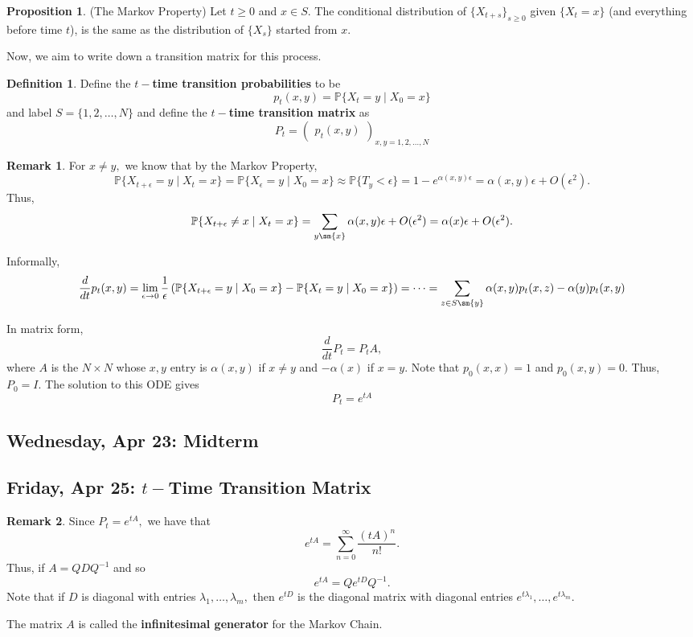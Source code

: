 \documentclass[10pt, oneside]{article}
\newcommand{\bbP}{\mathbb{P}}
\theoremstyle{definition}
\newtheorem{defn}{Definition}
\newtheorem{prop}{Proposition}
\newtheorem{rem}{Remark}
\begin{document}
\begin{prop}
(The Markov Property)
    Let $t \geq 0$ and $x\in S.$ The conditional distribution of $\{X_{t + s}\}_{s\geq 0 }$ given $\{X_t = x\}$ (and everything before time $t$), is the same as the distribution of $\{X_s\}$ started from $x.$ 
\end{prop}

Now, we aim to write down a transition matrix for this process. 
\begin{defn}
    Define the \textbf{$t-$time transition probabilities} to be 
    \[p_t(x,y) = \bbP\{X_t = y  \mid X_0 = x\}\] and label $S = \{1,2,\dots, N\}$ and define the \textbf{$t-$time transition matrix} as 
    \[P_t = \begin{pmatrix}
        p_t(x,y)
    \end{pmatrix}_{x,y = 1,2,\dots, N}\]
\end{defn}
\begin{rem}
For $x\neq y,$ we know that by the Markov Property, 
\[\bbP\{X_{t  + \epsilon} = y \mid X_t = x\} = \bbP\{X_\epsilon = y \mid X_0 = x\} \approx \bbP\{T_y < \epsilon\} = 1 - e^{\alpha(x,y)\epsilon}  = \alpha(x,y)\epsilon + O(\epsilon^2).\] Thus, 
\[\bbP\{X_{t + \epsilon} \neq x \mid X_t = x\} = \sum_{y \sm \{x\}}\alpha(x,y)\epsilon  + O(\epsilon^2) = \alpha(x)\epsilon + O(\epsilon^2).\]

Informally, \[\frac{d}{dt}p_t(x,y) = \lim_{\epsilon \to 0} \frac{1}{\epsilon}\left(\bbP\{X_{t + \epsilon }  = y \mid X_0 = x\} - \bbP\{X_t = y \mid X_0 = x\}\right) = \cdots = \sum_{z\in S\sm \{y\}}\alpha(x,y)p_t(x,z) - \alpha(y)p_t(x,y)\]

In matrix form, 
\[\frac{d}{dt}P_t = P_tA,\] where $A$ is the $N\times N$ whose $x,y$ entry is $\alpha(x,y)$ if $x\neq y$ and $-\alpha(x)$ if $x = y.$ Note that $p_0 (x,x) = 1$ and $p_0(x,y) =0.$ Thus, $P_0 = I.$ The solution to this ODE gives 
\[P_t = e^{tA}\]

\end{rem}

\newpage
\subsection{Wednesday, Apr 23: Midterm}



\newpage
\subsection{Friday, Apr 25: $t-$Time Transition Matrix}
\begin{rem}
    Since $P_t = e^{tA},$ we have that 
    \[e^{tA} = \sum_{n=0}^\infty \frac{(tA)^n}{n!}.\] Thus, if $A = QDQ^{-1}$ and so 
    \[e^{tA} = Q e^{tD}Q^{-1}.\] Note that if $D$ is diagonal with entries $\lambda_1, \dots, \lambda_m,$ then $e^{tD}$ is the diagonal matrix with diagonal entries $e^{t\lambda_1}, \dots, e^{t\lambda_m}.$

    The matrix $A$ is called the \textbf{infinitesimal generator} for the Markov Chain.
\end{rem}
\end{document}
